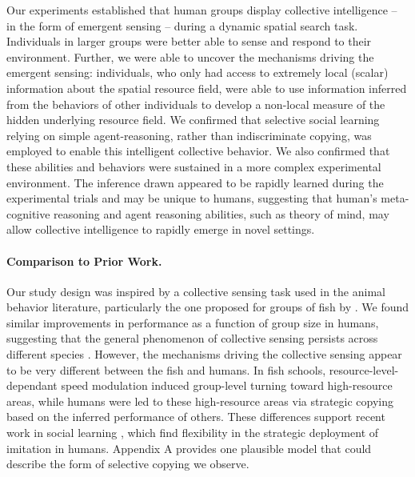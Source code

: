 \documentclass[12pt,letterpaper]{article}
\begin{document}
Our experiments established that human groups display collective intelligence -- in the form of emergent sensing -- during a dynamic spatial search task.
Individuals in larger groups were better able to sense and respond to their environment.
Further, we were able to uncover the mechanisms driving the emergent sensing:
individuals, who only had access to extremely local (scalar) information about the spatial resource field,  were able to use information inferred from the behaviors of other individuals to develop a non-local measure of the hidden underlying resource field. We confirmed that selective social learning relying on simple agent-reasoning, rather than indiscriminate copying, was employed to enable this intelligent collective behavior. We also confirmed that these abilities and behaviors were sustained in a more complex experimental environment.
The inference drawn appeared to be rapidly learned during the experimental trials and may be unique to humans, suggesting that human's meta-cognitive reasoning and agent reasoning abilities, such as theory of mind, may allow collective intelligence to rapidly emerge in novel settings.


\paragraph{Comparison to Prior Work.}

Our study design was inspired by a collective sensing task used in the animal behavior literature, particularly the one proposed for groups of fish by . 
We found similar improvements in performance as a function of group size in humans, suggesting that the general phenomenon of collective sensing persists across different species \cite{berdahl2018collective}.
However,  the mechanisms driving the collective sensing appear to be very different between the fish and humans. 
In fish schools, resource-level-dependant speed modulation induced group-level turning toward high-resource areas, while humans were led to these high-resource areas via strategic copying based on the inferred performance of others.
These differences support recent work in social learning \cite{wisdom_social_2013, mcelreath_beyond_2008}, which find flexibility in the strategic deployment of imitation in humans. Appendix A provides one plausible model that could describe the form of selective copying we observe.
\end{document}
